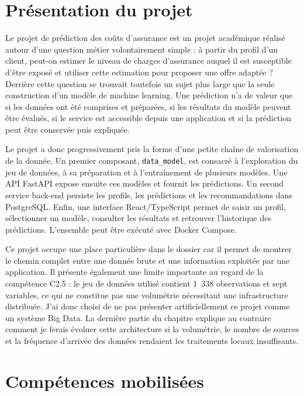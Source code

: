 \section{Présentation du projet}

Le projet de prédiction des coûts d'assurance est un projet académique réalisé autour d'une question métier volontairement simple : à partir du profil d'un client, peut-on estimer le niveau de charges d'assurance auquel il est susceptible d'être exposé et utiliser cette estimation pour proposer une offre adaptée ? Derrière cette question se trouvait toutefois un sujet plus large que la seule construction d'un modèle de machine learning. Une prédiction n'a de valeur que si les données ont été comprises et préparées, si les résultats du modèle peuvent être évalués, si le service est accessible depuis une application et si la prédiction peut être conservée puis expliquée.

Le projet a donc progressivement pris la forme d'une petite chaîne de valorisation de la donnée. Un premier composant, \texttt{data\_model}, est consacré à l'exploration du jeu de données, à sa préparation et à l'entraînement de plusieurs modèles. Une API FastAPI expose ensuite ces modèles et fournit les prédictions. Un second service back-end persiste les profils, les prédictions et les recommandations dans PostgreSQL. Enfin, une interface React/TypeScript permet de saisir un profil, sélectionner un modèle, consulter les résultats et retrouver l'historique des prédictions. L'ensemble peut être exécuté avec Docker Compose.

Ce projet occupe une place particulière dans le dossier car il permet de montrer le chemin complet entre une donnée brute et une information exploitée par une application. Il présente également une limite importante au regard de la compétence C2.5 : le jeu de données utilisé contient 1~338 observations et sept variables, ce qui ne constitue pas une volumétrie nécessitant une infrastructure distribuée. J'ai donc choisi de ne pas présenter artificiellement ce projet comme un système Big Data. La dernière partie du chapitre explique au contraire comment je ferais évoluer cette architecture si la volumétrie, le nombre de sources et la fréquence d'arrivée des données rendaient les traitements locaux insuffisants.

\section{Compétences mobilisées}


